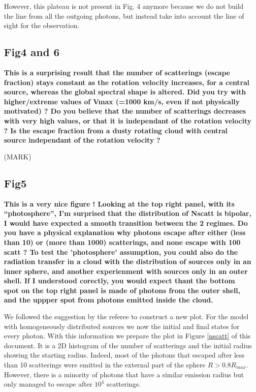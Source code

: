 \documentclass[12pt]{article}
\begin{document}
However, this plateau is not present in Fig. 4 anymore because we do
not build the line from all the outgoing photons, but instead take
into account the line of sight for the observation.


\subsection*{Fig4 and 6}

{\bf This is a surprising result that the number of scatterings
  (escape fraction) stays constant as the rotation velocity increases,
  for a central source, whereas the global spectral shape is
  altered. Did you try with higher/extreme values of Vmax (=1000 km/s,
  even if not physically motivated) ? Do you believe that the number
  of scatterings decreases with very high values, or that it is
  independant of the rotation velocity ? Is the escape fraction from a
  dusty rotating cloud with central source independant of the rotation
  velocity ?} 

(MARK) 

\subsection*{Fig5}

{\bf This is a very nice figure ! Looking at the top right panel, with
  its “photosphere”, I’m surprised that the distribution of Nscatt is
  bipolar, I would have expected a smooth transition between the 2
  regimes. Do you have a physical explanation why photons escape after
  either (less than 10) or (more than 1000) scatterings, and none
  escape with 100 scatt ? To test the ’photosphere’ assumption, you
  could also do the radiation transfer in a cloud with the
  distribution of sources only in an inner sphere, and another
  experienment with sources only in an outer shell. If I understood
  corectly, you would expect thant the bottom spot on the top right
  panel is made of photons from the outer shell, and the uppper spot
  from photons emitted inside the cloud.} 

We followed the suggestion by the referee to construct a new
plot. For the model with homogeneously distributed sources we now the
initial and final states for every photon. With this information we
prepare the plot in Figure \ref{nscatt} of this document. It is a 2D
histogram of the number of scatterings and the initial radius showing
the starting radius. Indeed, most of the photons that escaped after
less than 10 scatterings were emitted in the external part of the
sphere $R>0.8R_{max}$. However, there is a minority of photons that
have a similar emission radius but only managed to escape after $10^4$
scatterings. 
\end{document}
